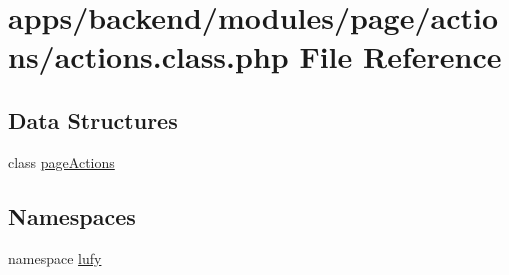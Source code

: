 \hypertarget{backend_2modules_2page_2actions_2actions_8class_8php}{\section{apps/backend/modules/page/actions/actions.class.\-php File Reference}
\label{backend_2modules_2page_2actions_2actions_8class_8php}
}
\subsection*{Data Structures}
\begin{DoxyCompactItemize}
\item 
class \hyperlink{classpage_actions}{page\-Actions}
\end{DoxyCompactItemize}
\subsection*{Namespaces}
\begin{DoxyCompactItemize}
\item 
namespace \hyperlink{namespacelufy}{lufy}
\end{DoxyCompactItemize}
